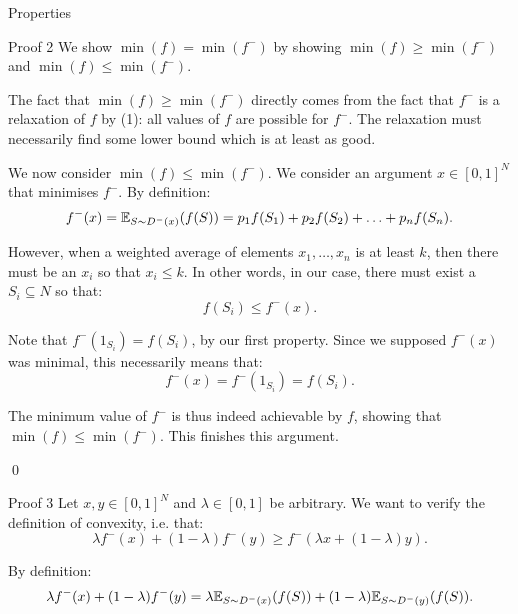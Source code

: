 \documentclass[a4paper]{article}
\begin{document}
\begin{parag}{Properties}
    \begin{subparag}{Proof 2}
        We show $\min\left(f\right) = \min\left(f^-\right)$ by showing $\min\left(f\right) \geq \min\left(f^-\right)$ and $\min\left(f\right) \leq \min\left(f^-\right)$.

        The fact that $\min\left(f\right) \geq \min\left(f^-\right)$ directly comes from the fact that $f^-$ is a relaxation of $f$ by (1): all values of $f$ are possible for $f^-$. The relaxation must necessarily find some lower bound which is at least as good.

        We now consider $\min\left(f\right) \leq \min\left(f^-\right)$. We consider an argument $x \in \left[0, 1\right]^N$ that minimises $f^-$. By definition: 
        \[f^-\left(x\right) = \exval_{S \followsdistr D^-\left(x\right)} \left(f\left(S\right)\right) = p_1 f\left(S_1\right) + p_2 f\left(S_2\right) + \ldots + p_n f\left(S_n\right).\]
        
        However, when a weighted average of elements $x_1, \ldots, x_n$ is at least $k$, then there must be an $x_i$ so that $x_i \leq k$. In other words, in our case, there must exist a $S_i \subseteq N$ so that: 
        \[f\left(S_i\right) \leq f^-\left(x\right).\]

        Note that $f^-\left(1_{S_i}\right) = f\left(S_i\right)$, by our first property. Since we supposed $f^-\left(x\right)$ was minimal, this necessarily means that: 
        \[f^-\left(x\right) = f^-\left(1_{S_i}\right) = f\left(S_i\right).\]

        The minimum value of $f^-$ is thus indeed achievable by $f$, showing that $\min\left(f\right) \leq \min\left(f^-\right)$. This finishes this argument.

        \qed
    \end{subparag}

    \begin{subparag}{Proof 3}
        Let $x, y \in \left[0, 1\right]^N$ and $\lambda \in \left[0, 1\right]$ be arbitrary. We want to verify the definition of convexity, i.e. that: 
        \[\lambda f^-\left(x\right) + \left(1 - \lambda\right) f^-\left(y\right) \geq f^-\left(\lambda x + \left(1 - \lambda\right)y\right).\]

        By definition: 
        \[\lambda f^-\left(x\right) + \left(1- \lambda\right) f^-\left(y\right) = \lambda \exval_{S \followsdistr D^-\left(x\right)}\left(f\left(S\right)\right) + \left(1 - \lambda\right) \exval_{S \followsdistr D^-\left(y\right)}\left(f\left(S\right)\right).\]


\end{subparag}
\end{parag}
\end{document}
